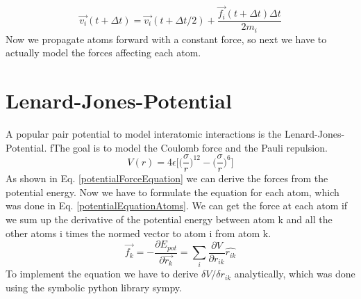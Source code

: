 \begin{equation}
	\label{verletCorrection}
	\overrightarrow{v_{i}}(t+\Delta t) = \overrightarrow{v_{i}}(t+\Delta t/2) +
	\frac{\overrightarrow{f_{i}}(t + \Delta t)\Delta t}{2m_{i}}
\end{equation}
Now we propagate atoms forward with a constant force, so next we have to actually model the forces affecting each atom.


\section{Lenard-Jones-Potential}
\begin{comment}
- pair potential
\end{comment}
A popular pair potential to model interatomic interactions is the Lenard-Jones-Potential. 
fThe goal is to model the Coulomb force and the Pauli repulsion. 
\begin{equation}
	V(r) = 4\epsilon\bigg[\Big(\frac{\sigma}{r}\Big)^{12}- \Big(\frac{\sigma}{r}\Big)^{6} \bigg]
\end{equation}
As shown in Eq. \ref{potentialForceEquation} we can derive the forces from the potential energy. Now we have to formulate the equation for each atom, which was done in Eq. \ref {potentialEquationAtoms}. We can get the force at each atom if we sum up the derivative of the potential energy between atom k and all the other atoms i times the normed vector to atom i from atom k. 
\begin{equation}
	\label{potentialEquationAtoms}
	\overrightarrow{f_{k}} = -\frac{\partial E_{pot}}{\partial  \overrightarrow{r_{k}}}=\sum_{i}^{}\frac{\partial V}{\partial r_{ik}} \hat{r_{ik}}
\end{equation}
To implement the equation we have to derive $\delta V/ \delta r_{ik}$ analytically, which was done using the symbolic python library sympy. 
